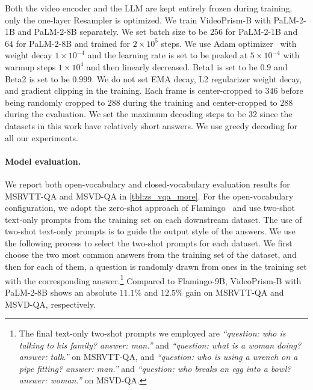 \documentclass{article}
\theoremstyle{plain}
\theoremstyle{definition}
\theoremstyle{remark}
\newcommand{\OURS}{VideoPrism\xspace}
\begin{document}
Both the video encoder and the LLM are kept entirely frozen during training, only the one-layer Resampler is optimized. We train \OURS-B with PaLM-2-1B and PaLM-2-8B separately. We set batch size to be $256$ for PaLM-2-1B and $64$ for PaLM-2-8B and trained for $2 \times 10^5$ steps. We use Adam optimizer~\cite{kingma2014adam} with weight decay $1 \times 10^{-4}$ and the learning rate is set to be peaked at $5 \times 10^{-4}$ with warmup steps $1 \times 10^4$ and then linearly decreased. Beta1 is set to be $0.9$ and Beta2 is set to be $0.999$. We do not set EMA decay, L2 regularizer weight decay, and gradient clipping in the training.  Each frame is center-cropped to $346$ before being randomly cropped to $288$ during the training and center-cropped to $288$ during the evaluation. We set the maximum decoding steps to be $32$ since the datasets in this work have relatively short answers. We use greedy decoding for all our experiments. 


\paragraph{Model evaluation.}
We report both open-vocabulary and closed-vocabulary evaluation results for MSRVTT-QA and MSVD-QA in \cref{tbl:zs_vqa_more}. For the open-vocabulary configuration, we adopt the zero-shot approach of Flamingo~\cite{alayrac2022flamingo} and use two-shot text-only prompts from the training set on each downstream dataset. The use of two-shot text-only prompts is to guide the output style of the answers. We use the following process to select the two-shot prompts for each dataset. We first choose the two most common answers from the training set of the dataset, and then for each of them, a question is randomly drawn from ones in the training set with the corresponding answer.\footnote{The final text-only two-shot prompts we employed are \emph{``question: who is talking to his family? answer: man.''} and \emph{``question: what is a woman doing? answer: talk.''} on MSRVTT-QA, and \emph{``question: who is using a wrench on a pipe fitting? answer: man.''} and \emph{``question: who breaks an egg into a bowl? answer: woman.''} on MSVD-QA.} Compared to Flamingo-9B, \OURS-B with PaLM-2-8B shows an absolute $11.1\%$ and $12.5\%$ gain on MSRVTT-QA and MSVD-QA, respectively.
\end{document}
